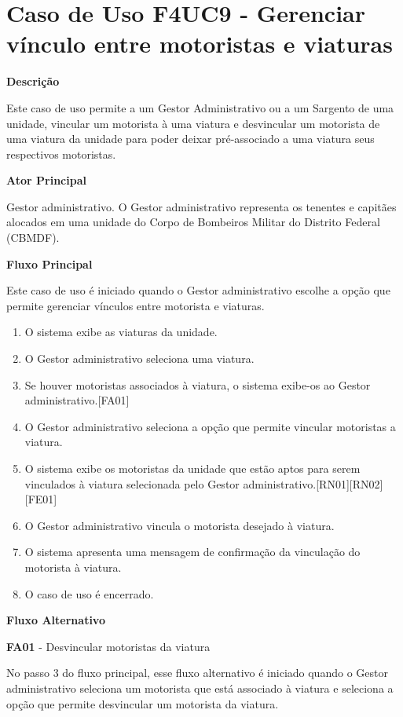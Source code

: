 
  \section{Caso de Uso F4UC9 - Gerenciar vínculo entre motoristas e viaturas}

  {\raggedright
      \textbf{Descrição}
  }

   Este caso de uso permite a um Gestor Administrativo ou a um Sargento de uma unidade, vincular um motorista à uma viatura e
   desvincular um motorista de uma viatura da unidade para poder deixar pré-associado a uma viatura seus respectivos motoristas.

    
  {\raggedright
      \textbf{Ator Principal}
  }

     Gestor administrativo. O Gestor administrativo representa os tenentes e capitães alocados em uma unidade do Corpo de Bombeiros Militar do Distrito Federal (CBMDF).

  {\raggedright
      \textbf{Fluxo Principal}
  }
  
    Este caso de uso é iniciado quando o Gestor administrativo escolhe a opção que permite gerenciar vínculos entre motorista e viaturas.
    
  
  \begin{enumerate}
    \item O sistema exibe as viaturas da unidade.
    \item O Gestor administrativo seleciona uma viatura.
    \item Se houver motoristas associados à viatura, o sistema exibe-os ao Gestor administrativo.[FA01]
    \item O Gestor administrativo seleciona a opção que permite vincular motoristas a viatura.
    \item O sistema exibe os motoristas da unidade que estão aptos para serem vinculados à viatura selecionada pelo Gestor administrativo.[RN01][RN02][FE01]
    \item O Gestor administrativo vincula o motorista desejado à viatura.
    \item O sistema apresenta uma mensagem de confirmação da vinculação do motorista à viatura.
    \item O caso de uso é encerrado.
  \end{enumerate}
  
  {\raggedright
      \textbf{Fluxo Alternativo}
  }
  
    \textbf{FA01} - Desvincular motoristas da viatura
  
    No passo 3 do fluxo principal, esse fluxo alternativo é iniciado quando o Gestor administrativo seleciona um motorista que está
    associado à viatura e seleciona a opção que permite desvincular um motorista da viatura.

